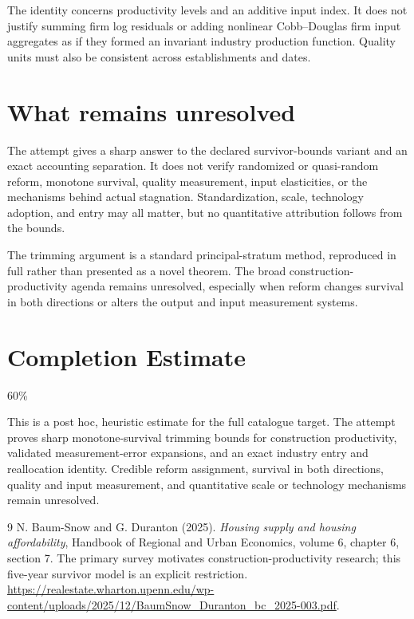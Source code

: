 \documentclass[11pt,a4paper]{article}
\begin{document}
The identity concerns productivity levels and an additive input index. It does not justify summing firm log residuals or adding nonlinear Cobb--Douglas firm input aggregates as if they formed an invariant industry production function. Quality units must also be consistent across establishments and dates.
\section{What remains unresolved}
The attempt gives a sharp answer to the declared survivor-bounds variant and an exact accounting separation. It does not verify randomized or quasi-random reform, monotone survival, quality measurement, input elasticities, or the mechanisms behind actual stagnation. Standardization, scale, technology adoption, and entry may all matter, but no quantitative attribution follows from the bounds.

The trimming argument is a standard principal-stratum method, reproduced in full rather than presented as a novel theorem. The broad construction-productivity agenda remains unresolved, especially when reform changes survival in both directions or alters the output and input measurement systems.

\section{Completion Estimate}
60\%

This is a post hoc, heuristic estimate for the full catalogue target.
The attempt proves sharp monotone-survival trimming bounds for construction productivity, validated measurement-error expansions, and an exact industry entry and reallocation identity. Credible reform assignment, survival in both directions, quality and input measurement, and quantitative scale or technology mechanisms remain unresolved.

\begin{thebibliography}{9}
 N. Baum-Snow and G. Duranton (2025).
\emph{Housing supply and housing affordability}, Handbook of Regional and Urban Economics, volume 6, chapter 6, section 7.
The primary survey motivates construction-productivity research; this five-year survivor model is an explicit restriction.
\url{https://realestate.wharton.upenn.edu/wp-content/uploads/2025/12/BaumSnow_Duranton_bc_2025-003.pdf}.
\end{thebibliography}
\end{document}
